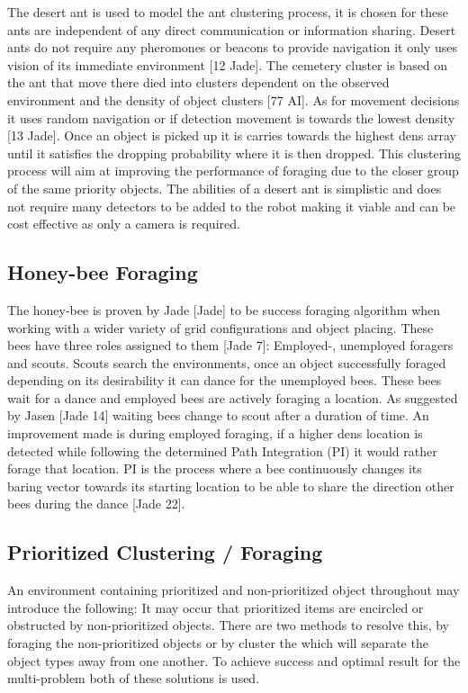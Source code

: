 \documentclass[12pt]{article}
\begin{document}
\par{The desert ant is used to model the ant clustering process, it is chosen for these ants are independent of any direct communication or information sharing. Desert ants do not require any pheromones or beacons to provide navigation it only uses vision of its immediate environment [12 Jade]. The cemetery cluster is based on the ant that move there died into clusters dependent on the observed environment and the density of object clusters [77 AI]. As for movement decisions it uses random navigation or if detection movement is towards the lowest density [13 Jade]. Once an object is picked up it is carries towards the highest dens array until it satisfies the dropping probability where it is then dropped.  This clustering process will aim at improving the performance of foraging due to the closer group of the same priority objects. The abilities of a desert ant is simplistic and does not require many detectors to be added to the robot making it viable and can be cost effective as only a camera is required.}

\subsection*{Honey-bee Foraging}

\par{The honey-bee is proven by Jade [Jade] to be success foraging algorithm when working with a wider variety of grid configurations and object placing. These bees have three roles assigned to them [Jade 7]: Employed-, unemployed foragers and scouts. Scouts search the environments, once an object successfully foraged depending on its desirability it can dance for the unemployed bees. These bees wait for a dance and employed bees are actively foraging a location. As suggested by Jasen [Jade 14] waiting bees change to scout after a duration of time. An improvement made is during employed foraging, if a higher dens location is detected while following the determined Path Integration (PI) it would rather forage that  location. PI is the process where a bee continuously changes its baring vector towards its starting location to be able to share the direction other bees during the dance [Jade 22].}

\subsection*{Prioritized Clustering / Foraging}

\par{An environment containing prioritized and non-prioritized object throughout may introduce the following: It may occur that prioritized items are encircled or obstructed by non-prioritized objects. There are two methods to resolve this, by foraging the non-prioritized objects or by cluster the which will separate the object types away from one another. To achieve success and optimal result for the multi-problem both of these solutions is used.}
\end{document}

